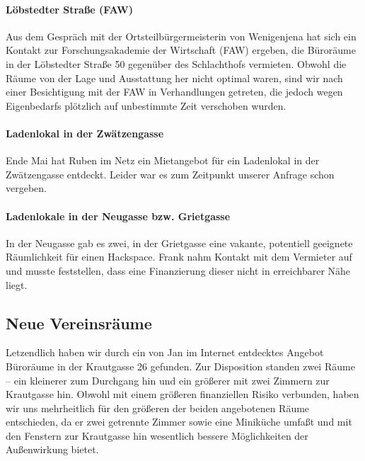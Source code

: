 \documentclass[10pt,DIV16]{scrartcl}
\begin{document}
\paragraph{Löbstedter Straße (FAW)}

Aus dem Gespräch mit der Ortsteilbürgermeisterin von Wenigenjena hat sich ein
Kontakt zur Forschungsakademie der Wirtschaft (FAW) ergeben, die Büroräume in
der Löbstedter Straße 50 gegenüber des Schlachthofs vermieten.  Obwohl die
Räume von der Lage und Ausstattung her nicht optimal waren, sind wir nach
einer Besichtigung mit der FAW in Verhandlungen getreten, die jedoch wegen
Eigenbedarfs plötzlich auf unbestimmte Zeit verschoben wurden.

\paragraph{Ladenlokal in der Zwätzengasse}

Ende Mai hat Ruben im Netz ein Mietangebot für ein Ladenlokal in der
Zwätzengasse entdeckt.  Leider war es zum Zeitpunkt unserer Anfrage schon
vergeben.

\paragraph{Ladenlokale in der Neugasse bzw. Grietgasse}

In der Neugasse gab es zwei, in der Grietgasse eine vakante, 
potentiell geeignete Räumlichkeit für einen Hackspace. Frank nahm 
Kontakt mit dem Vermieter auf und musste feststellen, dass eine 
Finanzierung dieser nicht in erreichbarer Nähe liegt.

\subsection{Neue Vereinsräume}

Letzendlich haben wir durch ein von Jan im Internet entdecktes Angebot
Büroräume in der Krautgasse 26 gefunden.  Zur Disposition standen zwei Räume
-- ein kleinerer zum Durchgang hin und ein größerer mit zwei Zimmern zur
Krautgasse hin.  Obwohl mit einem größeren finanziellen Risiko verbunden,
haben wir uns mehrheitlich für den größeren der beiden angebotenen Räume
entschieden, da er zwei getrennte Zimmer sowie eine Miniküche umfaßt und mit
den Fenstern zur Krautgasse hin wesentlich bessere Möglichkeiten der
Außenwirkung bietet.
\end{document}
